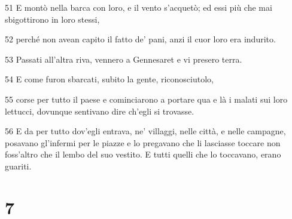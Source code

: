 \par 51 E montò nella barca con loro, e il vento s'acquetò; ed essi più che mai sbigottirono in loro stessi,
\par 52 perché non avean capito il fatto de' pani, anzi il cuor loro era indurito.
\par 53 Passati all'altra riva, vennero a Gennesaret e vi presero terra.
\par 54 E come furon sbarcati, subito la gente, riconosciutolo,
\par 55 corse per tutto il paese e cominciarono a portare qua e là i malati sui loro lettucci, dovunque sentivano dire ch'egli si trovasse.
\par 56 E da per tutto dov'egli entrava, ne' villaggi, nelle città, e nelle campagne, posavano gl'infermi per le piazze e lo pregavano che li lasciasse toccare non foss'altro che il lembo del suo vestito. E tutti quelli che lo toccavano, erano guariti.

\chapter{7}

